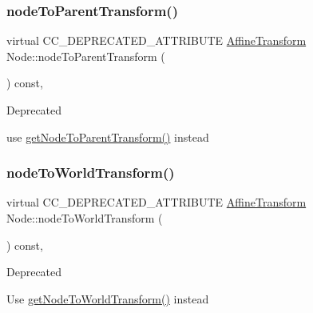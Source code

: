 \subsubsection{\texorpdfstring{node\+To\+Parent\+Transform()}{nodeToParentTransform()}\hspace{0.1cm}{\footnotesize\ttfamily [2/2]}}
{\footnotesize\ttfamily virtual C\+C\+\_\+\+D\+E\+P\+R\+E\+C\+A\+T\+E\+D\+\_\+\+A\+T\+T\+R\+I\+B\+U\+TE \hyperlink{structAffineTransform}{Affine\+Transform} Node\+::node\+To\+Parent\+Transform (\begin{DoxyParamCaption}{ }\end{DoxyParamCaption}) const\hspace{0.3cm}{\ttfamily [inline]}, {\ttfamily [virtual]}}

\begin{DoxyRefDesc}{Deprecated}
\item[\hyperlink{deprecated__deprecated000263}{Deprecated}]use \hyperlink{classNode_a7235b4a4d449fb7e01459c5c3b24d1eb}{get\+Node\+To\+Parent\+Transform()} instead \end{DoxyRefDesc}
\mbox{\label{classNode_a26eeb65a02646d8bbe366c9885893a75}} 
\subsubsection{\texorpdfstring{node\+To\+World\+Transform()}{nodeToWorldTransform()}\hspace{0.1cm}{\footnotesize\ttfamily [1/2]}}
{\footnotesize\ttfamily virtual C\+C\+\_\+\+D\+E\+P\+R\+E\+C\+A\+T\+E\+D\+\_\+\+A\+T\+T\+R\+I\+B\+U\+TE \hyperlink{structAffineTransform}{Affine\+Transform} Node\+::node\+To\+World\+Transform (\begin{DoxyParamCaption}{ }\end{DoxyParamCaption}) const\hspace{0.3cm}{\ttfamily [inline]}, {\ttfamily [virtual]}}

\begin{DoxyRefDesc}{Deprecated}
\item[\hyperlink{deprecated__deprecated000035}{Deprecated}]Use \hyperlink{classNode_a1e46065101d0d5dba32262067d85bf23}{get\+Node\+To\+World\+Transform()} instead \end{DoxyRefDesc}
\mbox{\label{classNode_a26eeb65a02646d8bbe366c9885893a75}} 
